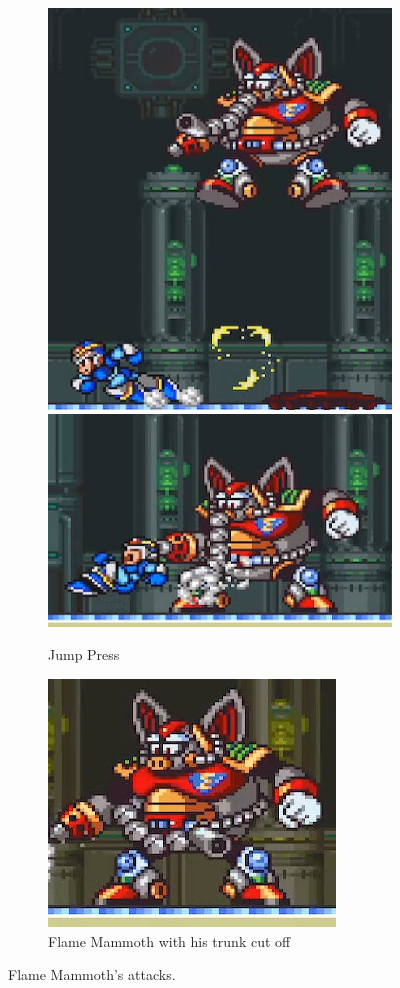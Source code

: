 \begin{figure}[htp]
	\begin{subfigure}{\textwidth}
		\centering
		\includegraphics[width=0.3\linewidth]{figures/X1/Flame_mammoth/Mammoth_press_1.jpg}
		\includegraphics[width=0.4\linewidth]{figures/X1/Flame_mammoth/Mammoth_press_2.jpg}
		\caption{Jump Press}
	\end{subfigure}
	\begin{subfigure}{0.3\textwidth}
		\centering
		\includegraphics[width=\linewidth]{figures/X1/Flame_mammoth/Mammoth_cut.jpg}
		\caption{Flame Mammoth with his trunk cut off}
	\end{subfigure}
	\caption{Flame Mammoth's attacks.}
\end{figure}
